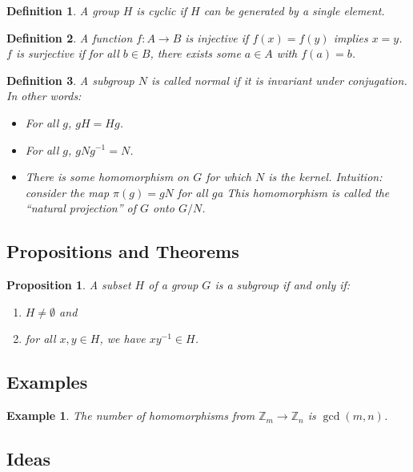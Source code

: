 \documentclass[12pt]{article}
\newtheorem*{definition}{Definition}
\newtheorem*{example}{Example}
\newtheorem*{prop}{Proposition}
\def\ZZ{\mathbb{Z}}
\begin{document}
\begin{definition}
  A group $H$ is cyclic if $H$ can be generated by a single element.
  \\
\end{definition}

\begin{definition}
  A function $f: A \to B$ is injective if $f(x) = f(y)$ implies $x=y$.  $f$ is surjective if for all $b \in B$, there exists some $a \in A$ with $f(a) = b$. \\
\end{definition}

\begin{definition}
  A subgroup $N$ is called {\it normal} if it is invariant under conjugation.  In other words:
  \begin{itemize}
    \item For all $g$, $gH = Hg$.
    \item For all $g$, $gNg^{-1} = N$.
    \item There is some homomorphism on $G$ for which $N$ is the kernel.  Intuition: consider the map $\pi(g) = gN$ for all $g$a  This homomorphism is called the ``natural projection'' of $G$ onto $G/N$.
  \end{itemize}
\end{definition}


\subsection{Propositions and Theorems}

\begin{prop}
  A subset $H$ of a group $G$ is a subgroup if and only if:
  \begin{enumerate}
    \item $H \neq \emptyset$ and
    \item for all $x, y \in H$, we have $xy^{-1} \in H$.
  \end{enumerate}
\end{prop}


\subsection{Examples}

\begin{example}
  The number of homomorphisms from $\ZZ_m \to \ZZ_n$ is $\gcd(m, n)$.
\end{example}

\subsection{Ideas}
\end{document}
